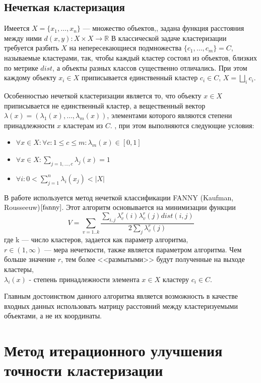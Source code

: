 \documentclass[a4paper, 12pt]{article} %
\begin{document}
\subsection{Нечеткая кластеризация}
Имеется $X=\{x_{1},\dots,x_{n}\}$ --- множество объектов,, задана функция расстояния между ними $d(x, y): X\times X  \to \mathbb{R}$ В классической задаче кластеризации требуется разбить $X$ на непересекающиеся подмножества $\{c_{1},\dots,c_{m}\} = C$,  называемые кластерами, так, чтобы каждый кластер состоял из объектов, близких по метрике $dist$, а объекты разных классов существенно отличались. При этом каждому объекту $x_{i} \in X$ приписывается единственный кластер $c_{i} \in C$, $X = \bigsqcup_{i} c_{i}$.
\par
 Особенностью нечеткой кластеризации является то, что объекту $x \in X$ приписывается не единственный кластер, а вещественный вектор $\lambda(x)=(\lambda_{1}(x),\dots,\lambda_{m}(x))$, элементами которого являются степени принадлежности $x$ кластерам из $C$. , при этом выполняются следующие условия:
 \begin{itemize}
 \item $\forall x \in X: \forall c: 1\leq c \leq m:  \lambda_{m}(x) \in [0,1]$
 \item $\forall x \in X: \sum_{j=1,\dots,c} \lambda_{j}(x) = 1$
 \item $\forall i : 0 < \sum_{j=1}^{n} \lambda_{i}(x_{j}) < |X|  $
 \end{itemize} 
 \par
 В работе используется метод нечеткой классификации FANNY (Kaufman, Rousseeuw)$\cite{fanny}$. Этот алгоритм основывается на минимизации функции 
\[
	V=\sum_{v=1..k} \frac{\sum_{i,j} \lambda_{v}^r(i) \lambda_{v}^r(j) dist(i,j)}{2 \sum_{j} \lambda_{v}^r(j)}
\]
где k --- число кластеров, задается как параметр алгоритма,\\
$r \in (1, \infty)$ --- мера нечеткости, также является параметром алгоритма. Чем больше значение $r$, тем более <<размытыми>> будут полученные на выходе кластеры,\\ $\lambda_{i}(x)$ - степень принадлежности элемента $x \in X$ кластеру $c_{i} \in C$. 
 \par
 Главным достоинством данного алгоритма является возможность в качестве входных данных использовать матрицу расстояний между кластеризуемыми объектами, а не их координаты. 

\section{Метод итерационного улучшения точности кластеризации}
\end{document}
